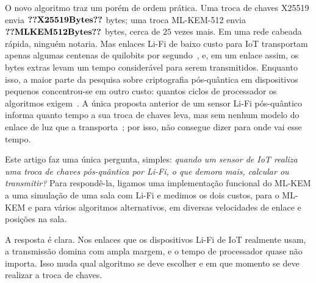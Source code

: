 O novo algoritmo traz um porém de ordem prática. Uma troca de chaves X25519
envia $\val{X25519Bytes}$ bytes; uma troca ML-KEM-512 envia
$\val{MLKEM512Bytes}$ bytes, cerca de $25$ vezes mais. Em uma rede cabeada
rápida, ninguém notaria. Mas enlaces Li-Fi de baixo custo para IoT transportam
apenas algumas centenas de quilobits por
segundo~\cite{galisteo2019openvlc}, e, em um enlace assim, os bytes extras
levam um tempo considerável para serem transmitidos. Enquanto isso, a maior
parte da pesquisa sobre criptografia pós-quântica em dispositivos pequenos
concentrou-se em outro custo: quantos ciclos de processador os algoritmos
exigem~\cite{pqm4,burstinghaus2020pqm}. A única proposta anterior de um sensor
Li-Fi pós-quântico informa quanto tempo a sua troca de chaves leva, mas sem
nenhum modelo do enlace de luz que a transporta~\cite{nurmurodov2025esp32}; por
isso, não consegue dizer para onde vai esse tempo.

Este artigo faz uma única pergunta, simples: \emph{quando um sensor de IoT
realiza uma troca de chaves pós-quântica por Li-Fi, o que demora mais, calcular
ou transmitir?} Para respondê-la, ligamos uma implementação funcional do ML-KEM
a uma simulação de uma sala com Li-Fi e medimos os dois custos, para o ML-KEM e
para vários algoritmos alternativos, em diversas velocidades de enlace e
posições na sala.

A resposta é clara. Nos enlaces que os dispositivos Li-Fi de IoT realmente
usam, a transmissão domina com ampla margem, e o tempo de processador quase não
importa. Isso muda qual algoritmo se deve escolher e em que momento se deve
realizar a troca de chaves.

